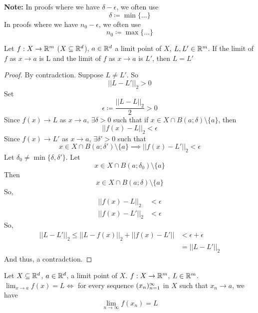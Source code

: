 \documentclass[openany]{report}
\begin{document}
\textbf{Note:} In proofs where we have $\delta - \epsilon$, we often use
$$\delta \coloneqq \min \{\ldots\}$$
In proofs where we have $n_0 - \epsilon$, we often use
$$n_0 \coloneqq \max \{\ldots\}$$
\begin{prop}
    Let $f: X \rightarrow \mathbb{R}^m$ ($X \subseteq \mathbb{R}^d$), $a \in \mathbb{R}^d$
    a limit point of $X$, $L, L' \in \mathbb{R}^m$. If the limit of $f$ as $x \rightarrow a$ is L
    and the limit of $f$ as $x \rightarrow a$ is $L'$, then $L = L'$
\end{prop}
\begin{proof}
    By contradction. Suppose $L \neq L'$. So 
    $$||L - L'||_2 > 0$$
    Set 
    $$\epsilon \coloneqq \frac{||L - L||_2}{2} > 0$$
    Since $f(x) \rightarrow L$ as $x \rightarrow a$, $\exists \delta > 0$
    such that if $x \in X \cap B(a; \delta)\setminus \{a\}$, then
    $$||f(x) - L||_2 < \epsilon$$
    Since $f(x) \rightarrow L'$ as $x \rightarrow a$, $\exists \delta' > 0$ such that
    $$x \in X \cap B(a;\delta')\setminus \{a\} \implies ||f(x) - L'||_2 < \epsilon$$
    Let $\delta_0 \neq \min \{\delta, \delta'\}$. Let 
    $$x \in X \cap B(a;\delta_0) \setminus \{a\}$$
    Then
    $$x \in X \cap B(a; \delta) \setminus \{a\}$$
    So,
    \begin{align*}
        ||f(x) - L||_2 &< \epsilon\\
        ||f(x) - L'||_2 &< \epsilon
    \end{align*}
    So, 
    \begin{align*}
        ||L - L'||_2 \leq ||L - f(x)||_2 + ||f(x) - L'|| &< \epsilon + \epsilon\\
        &= ||L - L'||_2
    \end{align*}
    And thus, a contradction. 
\end{proof}
\begin{prop}
    Let $X \subseteq \mathbb{R}^d$, $a \in \mathbb{R}^d$, a limit point of $X$.
    $f: X \rightarrow \mathbb{R}^m$, $L \in \mathbb{R}^m$.\\[1ex]
    $\lim_{x\rightarrow a} f(x) = L \iff$ for every sequence $({x}_n)_{n=1}^\infty$ in $X$
    such that $x_n \rightarrow a$, we have 
    $$\lim_{n \rightarrow \infty} f(x_n) = L$$
    
\end{prop}
\end{document}
